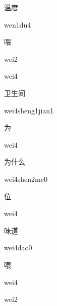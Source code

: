 \begin{verbete}[wen1du4]{温度}
\begin{pronuncia}{wen1du4}
\end{pronuncia}
\end{verbete}

\begin{verbete}[wei2]{喂}
\begin{pronuncia}{wei2}
\end{pronuncia}
\begin{pronuncia}{wei4}
\end{pronuncia}
\end{verbete}

\begin{verbete}{卫生间}
\begin{pronuncia}{wei4sheng1jian1}
\end{pronuncia}
\end{verbete}

\begin{verbete}[wei4]{为}
\begin{pronuncia}{wei4}
\end{pronuncia}

\end{verbete}
\begin{verbete}{为什么}
\begin{pronuncia}{wei4shen2me0}
\end{pronuncia}
\end{verbete}

\begin{verbete}[wei4]{位}
\begin{pronuncia}{wei4}
\end{pronuncia}
\end{verbete}

\begin{verbete}{味道}
\begin{pronuncia}{wei4dao0}
\end{pronuncia}
\end{verbete}

\begin{verbete}[wei4]{喂}
\begin{pronuncia}{wei4}
\end{pronuncia}
\begin{pronuncia}{wei2}
\end{pronuncia}
\end{verbete}

